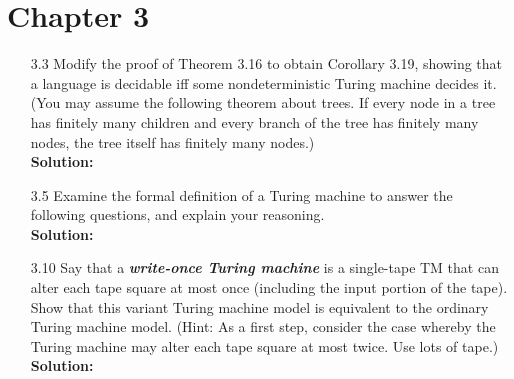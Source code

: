 \section{Chapter 3}
\begin{enumerate}

\item[3.3]Modify the proof of Theorem 3.16 to obtain Corollary 3.19, showing that a language is decidable iff some nondeterministic Turing machine decides it. (You may assume the following theorem about trees. If every node in a tree has finitely many children and every branch of the tree has finitely many nodes, the tree itself has finitely many nodes.)
\\
\textbf{Solution:} \alreadyanswered

\item[3.5]Examine the formal definition of a Turing machine to answer the following questions, and explain your reasoning.
\\
\textbf{Solution:} \alreadyanswered

\item[3.10]Say that a \textbf{\emph{write-once Turing machine}} is a single-tape TM that can alter each tape square at most once (including the input portion of the tape). Show that this variant Turing machine model is equivalent to the ordinary Turing machine model. (Hint: As a first step, consider the case whereby the Turing machine may alter each tape square at most twice. Use lots of tape.)
\\
\textbf{Solution:} \alreadyanswered


\end{enumerate}
